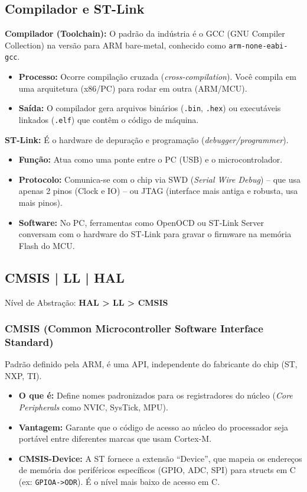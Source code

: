 \documentclass[12pt,a4paper]{article}
\begin{document}
\subsection{Compilador e ST-Link}
\textbf{Compilador (Toolchain):} O padrão da indústria é o GCC (GNU Compiler Collection) na versão para ARM bare-metal, conhecido como \texttt{arm-none-eabi-gcc}.
\begin{itemize}
    \item \textbf{Processo:} Ocorre compilação cruzada (\textit{cross-compilation}). Você compila em uma arquitetura (x86/PC) para rodar em outra (ARM/MCU).
    \item \textbf{Saída:} O compilador gera arquivos binários (\texttt{.bin}, \texttt{.hex}) ou executáveis linkados (\texttt{.elf}) que contêm o código de máquina.
\end{itemize}

\textbf{ST-Link:} É o hardware de depuração e programação (\textit{debugger/programmer}).
\begin{itemize}
    \item \textbf{Função:} Atua como uma ponte entre o PC (USB) e o microcontrolador.
    \item \textbf{Protocolo:} Comunica-se com o chip via SWD (\textit{Serial Wire Debug}) – que usa apenas 2 pinos (Clock e IO) – ou JTAG (interface mais antiga e robusta, usa mais pinos).
    \item \textbf{Software:} No PC, ferramentas como OpenOCD ou ST-Link Server conversam com o hardware do ST-Link para gravar o firmware na memória Flash do MCU.
\end{itemize}

\subsection{CMSIS | LL | HAL}
Nível de Abstração: \textbf{HAL > LL > CMSIS}

\subsubsection{CMSIS (Common Microcontroller Software Interface Standard)}
Padrão definido pela ARM, é uma API, independente do fabricante do chip (ST, NXP, TI).
\begin{itemize}
    \item \textbf{O que é:} Define nomes padronizados para os registradores do núcleo (\textit{Core Peripherals} como NVIC, SysTick, MPU).
    \item \textbf{Vantagem:} Garante que o código de acesso ao núcleo do processador seja portável entre diferentes marcas que usam Cortex-M.
    \item \textbf{CMSIS-Device:} A ST fornece a extensão ``Device'', que mapeia os endereços de memória dos periféricos específicos (GPIO, ADC, SPI) para structs em C (ex: \texttt{GPIOA->ODR}). É o nível mais baixo de acesso em C.
\end{itemize}
\end{document}
